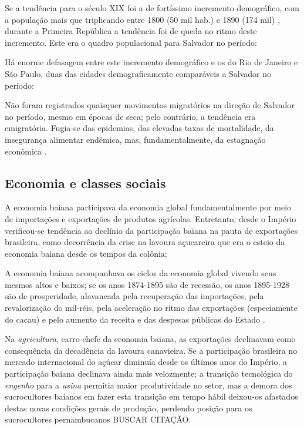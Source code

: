 Se a tendência para o século XIX foi a de fortíssimo incremento demográfico, com a população mais que triplicando entre 1800 (50 mil hab.) e 1890 (174 mil) \cite[p.~70]{sampaio_formas_1999}, durante a Primeira República a tendência foi de queda no ritmo deste incremento. Este era o quadro populacional para Salvador no período:



Há enorme defasagem entre este incremento demográfico e os do Rio de Janeiro e São Paulo, duas das cidades demograficamente comparáveis a Salvador no período:



Não foram registrados quaisquer movimentos migratórios na direção de Salvador no período, mesmo em épocas de seca; pelo contrário, a tendência era emigratória. Fugia-se das epidemias, das elevadas taxas de mortalidade, da insegurança alimentar endêmica, mas, fundamentalmente, da estagnação econômica \cite{santos_repovo_2001}.

\subsection{Economia e classes sociais}\label{subsubsec:ecobasa}

A economia baiana participava da economia global fundamentalmente por meio de importações e exportações de produtos agrícolas. Entretanto, desde o Império verificou-se tendência ao declínio da participação baiana na pauta de exportações brasileira, como decorrência da crise na lavoura açucareira que era o esteio da economia baiana desde os tempos da colônia; 

A economia baiana acompanhava os ciclos da economia global vivendo seus mesmos altos e baixos; se os anos 1874-1895 são de recessão, os anos 1895-1928 são de prosperidade, alavancada pela recuperação das importações, pela revalorização do mil-réis, pela aceleração no ritmo das exportações (especiamente do cacau) e pelo aumento da receita e das despesas públicas do Estado \cite[p.~28-29]{CPE1980}.

Na \textit{agricultura}, carro-chefe da economia baiana, as exportações declinavam como consequência da decadência da lavoura canavieira. Se a participação brasileira no mercado internacional do açúcar diminuía desde os últimos anos do Império, a participação baiana declinava ainda mais velozmente; a transição tecnológica do \textit{engenho} para a \textit{usina} permitia maior produtividade no setor, mas a demora dos sucrocultores baianos em fazer esta transição em tempo hábil deixou-os afastados destas novas condições gerais de produção, perdendo posição para os sucrocultores pernambucanos BUSCAR CITAÇÃO.

